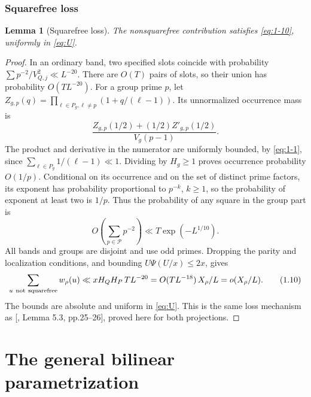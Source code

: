 \documentclass[11pt]{article}
\newtheorem{lemma}[theorem]{Lemma}
\theoremstyle{definition}
\theoremstyle{definition}
\begin{document}
\subsubsection{Squarefree loss}\label{sec:squares}
\begin{lemma}[Squarefree loss]\label{lem:squares}
The nonsquarefree contribution satisfies \eqref{eq:1-10}, uniformly in \eqref{eq:U}.
\end{lemma}
\begin{proof}
In an ordinary band, two specified slots coincide with probability
\(\sum p^{-2}/V_{Q,j}^2\ll L^{-20}\). There are \(O(T)\) pairs of slots, so their union has probability \(O(TL^{-20})\). For a group prime \(p\), let \(Z_{g,p}(q)=\prod_{\ell\in P_g,\ell\ne p}(1+q/(\ell-1))\). Its unnormalized occurrence mass is
\begin{equation*}
\frac{Z_{g,p}(1/2)+(1/2)Z'_{g,p}(1/2)}{V_g(p-1)}.
\end{equation*}
The product and derivative in the numerator are uniformly bounded, by \eqref{eq:1-1}, since \(\sum_{\ell\in P_g}1/(\ell-1)\ll1\). Dividing by \(H_g\ge1\) proves occurrence probability \(O(1/p)\). Conditional on its occurrence and on the set of distinct prime factors, its exponent has probability proportional to \(p^{-k}\), \(k\ge1\), so the probability of exponent at least two is \(1/p\). Thus the probability of any square in the group part is
\begin{equation*}
O\left(\sum_{p\in\mathcal P}p^{-2}\right)
 \ll T\exp(-L^{1/10}).
\end{equation*}
All bands and groups are disjoint and use odd primes. Dropping the parity and localization conditions, and bounding \(U\Psi(U/x)\le2x\), gives
\begin{equation}
\sum_{u\ {\rm not\ squarefree}}w_\rho(u)
 \ll xH_QH_P\,T L^{-20}
 =O(TL^{-18})\,X_\rho/L
 =o(X_\rho/L).                                         \tag{1.10}\label{eq:1-10}
\end{equation}
The bounds are absolute and uniform in \eqref{eq:U}. This is the same loss mechanism as [, Lemma 5.3, pp.25--26], proved here for both projections.


\end{proof}

\section{The general bilinear parametrization}\label{sec:s2}
\end{document}
